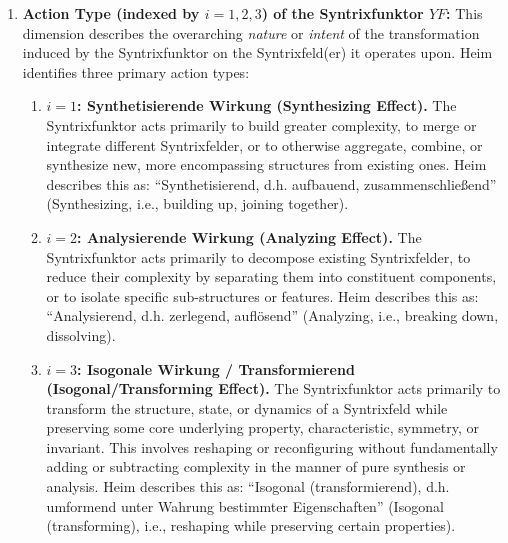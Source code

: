 \documentclass[
    12pt,              %
    a4paper,           %
    headings=normal,   %
    twoside=true,      %
    BCOR=8mm,          %
]{scrbook}
\newcommand{\q}[1]{\enquote{#1}}
\newcommand{\syntrixfunktor}{YF}
\begin{document}
\begin{enumerate}[label=(\alph*)]
    \item  \textbf{Action Type (indexed by \(i=1,2,3\)) of the Syntrixfunktor \(\syntrixfunktor\):}
        This dimension describes the overarching \textit{nature} or \textit{intent} of the transformation induced by the Syntrixfunktor on the Syntrixfeld(er) it operates upon. Heim identifies three primary action types:
        \begin{enumerate}[label=\roman*.]
            \item   \textbf{\(i=1\): Synthetisierende Wirkung (Synthesizing Effect).} The Syntrixfunktor acts primarily to build greater complexity, to merge or integrate different Syntrixfelder, or to otherwise aggregate, combine, or synthesize new, more encompassing structures from existing ones. Heim describes this as: \q{Synthetisierend, d.h. aufbauend, zusammenschließend} (Synthesizing, i.e., building up, joining together).
            \item   \textbf{\(i=2\): Analysierende Wirkung (Analyzing Effect).} The Syntrixfunktor acts primarily to decompose existing Syntrixfelder, to reduce their complexity by separating them into constituent components, or to isolate specific sub-structures or features. Heim describes this as: \q{Analysierend, d.h. zerlegend, auflösend} (Analyzing, i.e., breaking down, dissolving).
            \item   \textbf{\(i=3\): Isogonale Wirkung / Transformierend (Isogonal/Transforming Effect).} The Syntrixfunktor acts primarily to transform the structure, state, or dynamics of a Syntrixfeld while preserving some core underlying property, characteristic, symmetry, or invariant. This involves reshaping or reconfiguring without fundamentally adding or subtracting complexity in the manner of pure synthesis or analysis. Heim describes this as: \q{Isogonal (transformierend), d.h. umformend unter Wahrung bestimmter Eigenschaften} (Isogonal (transforming), i.e., reshaping while preserving certain properties).
        \end{enumerate}


\end{enumerate}
\end{document}
